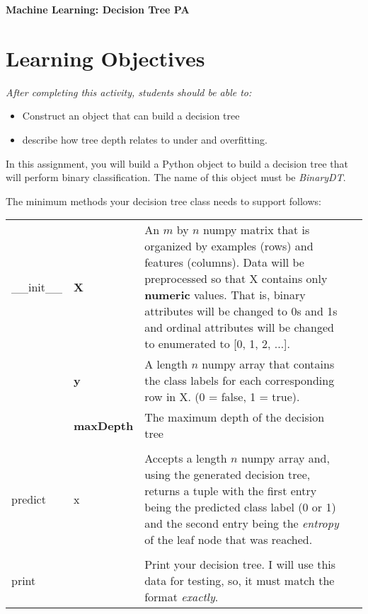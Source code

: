 \documentclass[11pt,letterpaper]{article}
\begin{document}
\thispagestyle{firststyle} 
\clearpage

\begin{center}
{\bf Machine Learning: Decision Tree PA}\\
\end{center}

\section*{Learning Objectives}
{\it After completing this activity, students should be able to:}
\begin{itemize}
\item Construct an object that can build a decision tree 
\item describe how tree depth relates to under and overfitting.  
\end{itemize}

In this assignment, you will build a Python object to build a decision tree that will perform binary classification. 
The name of this object must be \emph{BinaryDT}.  
\vspace{0.25 cm}

The minimum methods your decision tree class needs to support follows:\\
\begin{tabular}{l l p{14 cm}l}
\_\_init\_\_ & {\bf X}  & An $m$ by $n$ numpy matrix that is organized by examples (rows) and features (columns).  
Data will be preprocessed so that X contains only {\bf numeric}
values.  That is, binary attributes will be changed to 0s and 1s and ordinal attributes will be changed to enumerated
to [0, 1, 2, ...]. \\
& {\bf y}  & A length $n$ numpy array that contains the class labels for each corresponding row in X. (0 = false, 1 = true). \\
& {\bf maxDepth} & The maximum depth of the decision tree \\
& & \\
predict & x & Accepts a length $n$ numpy array and, using the generated decision tree, returns a tuple with the first entry being the predicted
class label (0 or 1) and the second entry being the \emph{entropy} of the leaf node that was reached.   \\
& & \\
print   &  & Print your decision tree.  I will use this data for testing, so, it must match the 
format \emph{exactly}.
\\ 
\end{tabular}
\end{document}
